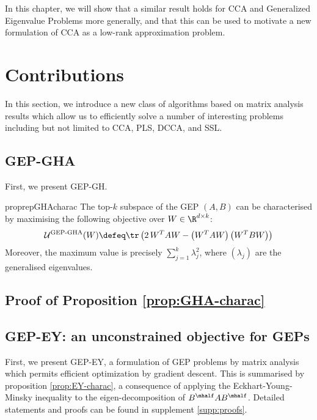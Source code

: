 In this chapter, we will show that a similar result holds for CCA and Generalized Eigenvalue Problems more generally, and that this can be used to motivate a new formulation of CCA as a low-rank approximation problem.


\section{Contributions}

In this section, we introduce a new class of algorithms based on matrix analysis results which allow us to efficiently solve a number of interesting problems including but not limited to CCA, PLS, DCCA, and SSL.

\subsection{GEP-GHA}
First, we present GEP-GH.

\begin{restatable}{proprep}{GHAcharac}
    \label{prop:GHA-charac}
    The top-$k$ subspace of the GEP $(A,B)$ can be characterised by maximising the following objective over $W \in \R^{d \times k}$:
    \begin{align}
        \mathcal{U}^\text{GEP-GHA}(W) \defeq \tr \left( 2\, W^T A W - \left(W^T A W\right) \left(W^T B W\right) \right)
    \end{align}
    Moreover, the maximum value is precisely $\sum_{j=1}^k \lambda_j^2$, where $(\lambda_j)$ are the generalised eigenvalues.
\end{restatable}

\subsection{Proof of Proposition \ref{prop:GHA-charac}}

\subsection{GEP-EY: an unconstrained objective for GEPs}

First, we present GEP-EY, a formulation of GEP problems by matrix analysis which permits efficient optimization by gradient descent.
This is summarised by proposition \ref{prop:EY-charac}, a consequence of applying the Eckhart-Young-Minsky inequality \cite{stewart_matrix_1990} to the eigen-decomposition of $B^\mhalf A B^\mhalf$. Detailed statements and proofs can be found in supplement \ref{supp:proofs}.


